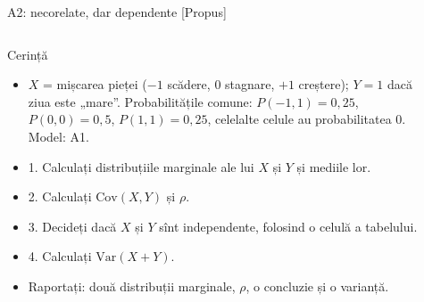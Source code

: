 \begin{frame}{A2: necorelate, dar dependente [Propus]}
\propsub
\itemsize{\scriptsize}
\begin{columns}[T]
\begin{column}{\taskw}
\begin{block}{Cerință}
\begin{itemize}
    \item $X$ = mișcarea pieței ($-1$ scădere, $0$ stagnare, $+1$ creștere); $Y = 1$ dacă ziua este „mare”. Probabilitățile comune: $P(-1, 1) = 0{,}25$, $P(0, 0) = 0{,}5$, $P(1, 1) = 0{,}25$, celelalte celule au probabilitatea 0. Model: A1.
    \item 1. Calculați distribuțiile marginale ale lui $X$ și $Y$ și mediile lor.
    \item 2. Calculați $\text{Cov}(X, Y)$ și $\rho$.
    \item 3. Decideți dacă $X$ și $Y$ sînt independente, folosind o celulă a tabelului.
    \item 4. Calculați $\text{Var}(X + Y)$.
    \item Raportați: două distribuții marginale, $\rho$, o concluzie și o varianță.
\end{itemize}
\end{block}
\end{column}
\begin{column}{\solw}
\end{column}
\end{columns}
\end{frame}

